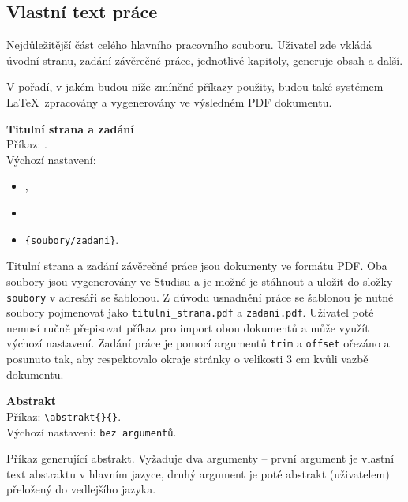 \subsection{Vlastní text práce}
\label{subsec:nalezitosti}
Nejdůležitější část celého hlavního pracovního souboru. Uživatel zde vkládá úvodní stranu, zadání závěrečné práce, jednotlivé kapitoly, generuje obsah a další.

V pořadí, v jakém budou níže zmíněné příkazy použity, budou také systémem \LaTeX\ zpracovány a vygenerovány ve výsledném PDF dokumentu.

\vspace{8pt}
\textbf{Titulní strana a zadání}\\
Příkaz: \verb||.\\
Výchozí nastavení:

\begin{itemize}[label={-}]
	\item \verb||,
	\item \verb||
	\item[ ]\hspace{70pt}\verb|{soubory/zadani}|.
\end{itemize}

Titulní strana a zadání závěrečné práce jsou dokumenty ve formátu PDF. Oba soubory jsou vygenerovány ve Studisu a je možné je stáhnout a uložit do složky \verb|soubory| v adresáři se šablonou. Z důvodu usnadnění práce se šablonou je nutné soubory pojmenovat jako \verb|titulni_strana.pdf| a \verb|zadani.pdf|. Uživatel poté nemusí ručně přepisovat příkaz pro import obou dokumentů a může využít výchozí nastavení. Zadání práce je pomocí argumentů \verb|trim| a \verb|offset| ořezáno a posunuto tak, aby respektovalo okraje stránky o velikosti 3 cm kvůli vazbě dokumentu.

\vspace{8pt}

\textbf{Abstrakt}\\
Příkaz: \verb|\abstrakt{}{}|.\\
Výchozí nastavení: \verb|bez argumentů|.

Příkaz generující abstrakt. Vyžaduje dva argumenty -- první argument je vlastní text abstraktu v hlavním jazyce, druhý argument je poté abstrakt (uživatelem) přeložený do vedlejšího jazyka.

\vspace{8pt}

